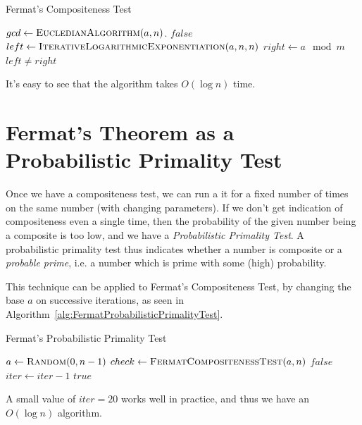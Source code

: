 \documentclass[11pt]{article}
\begin{document}
\begin{algorithm}
\caption{Fermat's Compositeness Test}
\label{alg:FermatCompositenessTest}
\begin{algorithmic}
\State $gcd \gets \Call{EucledianAlgorithm}{a, n}$.
	\State \Return $false$
\EndIf
\State $left \gets \Call{IterativeLogarithmicExponentiation}{a,n,n}$
\State $right \gets a \mod m$
\State \Return $left \neq right$
\EndProcedure
\end{algorithmic}
\end{algorithm}

It's easy to see that the algorithm takes $O(\log n)$ time.

\section{Fermat's Theorem as a Probabilistic Primality Test}

Once we have a compositeness test, we can run a it for a fixed number of times on the same number (with changing parameters). If we don't get indication of compositeness even a single time, then the probability of the given number being a composite is too low, and we have a \emph{Probabilistic Primality Test}. A probabilistic primality test thus indicates whether a number is composite or a \emph{probable prime}, i.e. a number which is prime with some (high) probability.

This technique can be applied to Fermat's Compositeness Test, by changing the base $a$ on successive iterations, as seen in Algorithm~\ref{alg:FermatProbabilisticPrimalityTest}.

\begin{algorithm}
\caption{Fermat's Probabilistic Primality Test}
\label{alg:FermatProbabilisticPrimalityTest}
\begin{algorithmic}
 
	\State $a \gets \Call{Random}{0,n-1}$ 
	\State $check \gets \Call{FermatCompositenessTest}{a,n}$
		\State \Return $false$ 
	\EndIf
	\State $iter \gets iter-1$
\EndWhile
\State \Return $true$ 
\EndProcedure
\end{algorithmic}
\end{algorithm}

A small value of $iter = 20$ works well in practice, and thus we have an $O(\log n)$ algorithm.
\end{document}
